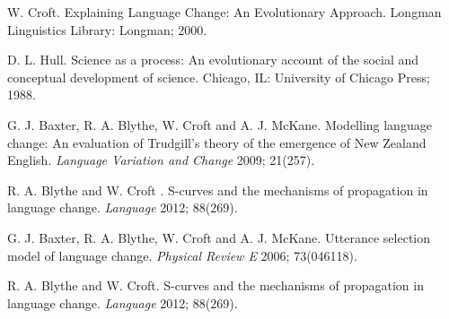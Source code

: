 \documentclass[12pt]{article}
\begin{document}
\newpage
\begin{thebibliography}{99}
 W. Croft. Explaining Language Change: An Evolutionary Approach. Longman Linguistics Library: Longman; 2000. 

 D. L. Hull. Science as a process: An evolutionary account of the social and conceptual development of science. Chicago, IL: University of Chicago Press; 1988. 

 G. J. Baxter, R. A. Blythe, W. Croft and A. J. McKane. Modelling language change: An evaluation of Trudgill’s theory of the emergence of New Zealand English. \emph{Language Variation and Change} 2009; 21(257).

 R. A. Blythe and W. Croft . S-curves and the mechanisms of propagation in language change. \emph{Language} 2012; 88(269).





	G. J. Baxter, R. A. Blythe, W. Croft and A. J. McKane. Utterance selection model of language change. \emph{Physical Review E} 2006; 73(046118). 



	R. A. Blythe and W. Croft. S-curves and the mechanisms of propagation in language change. \emph{Language} 2012; 88(269). 


\end{thebibliography}
\end{document}
